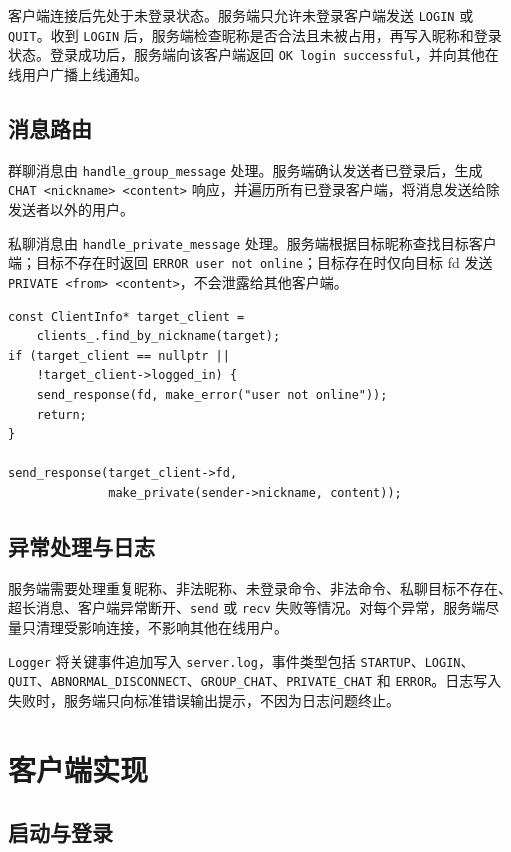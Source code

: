 \documentclass[UTF8,zihao=5,twocolumn]{ctexart}
\newcommand{\code}[1]{\texttt{#1}}
\begin{document}
客户端连接后先处于未登录状态。服务端只允许未登录客户端发送 \code{LOGIN} 或 \code{QUIT}。收到 \code{LOGIN} 后，服务端检查昵称是否合法且未被占用，再写入昵称和登录状态。登录成功后，服务端向该客户端返回 \code{OK login successful}，并向其他在线用户广播上线通知。

\subsection{消息路由}

群聊消息由 \code{handle\_group\_message} 处理。服务端确认发送者已登录后，生成 \code{CHAT <nickname> <content>} 响应，并遍历所有已登录客户端，将消息发送给除发送者以外的用户。

私聊消息由 \code{handle\_private\_message} 处理。服务端根据目标昵称查找目标客户端；目标不存在时返回 \code{ERROR user not online}；目标存在时仅向目标 fd 发送 \code{PRIVATE <from> <content>}，不会泄露给其他客户端。

\begin{lstlisting}[style=cppstyle,caption={私聊消息路由片段},label={lst:private}]
const ClientInfo* target_client =
    clients_.find_by_nickname(target);
if (target_client == nullptr ||
    !target_client->logged_in) {
    send_response(fd, make_error("user not online"));
    return;
}

send_response(target_client->fd,
              make_private(sender->nickname, content));
\end{lstlisting}

\subsection{异常处理与日志}

服务端需要处理重复昵称、非法昵称、未登录命令、非法命令、私聊目标不存在、超长消息、客户端异常断开、\code{send} 或 \code{recv} 失败等情况。对每个异常，服务端尽量只清理受影响连接，不影响其他在线用户。

\code{Logger} 将关键事件追加写入 \code{server.log}，事件类型包括 \code{STARTUP}、\code{LOGIN}、\code{QUIT}、\code{ABNORMAL\_DISCONNECT}、\code{GROUP\_CHAT}、\code{PRIVATE\_CHAT} 和 \code{ERROR}。日志写入失败时，服务端只向标准错误输出提示，不因为日志问题终止。

\section{客户端实现}

\subsection{启动与登录}
\end{document}
